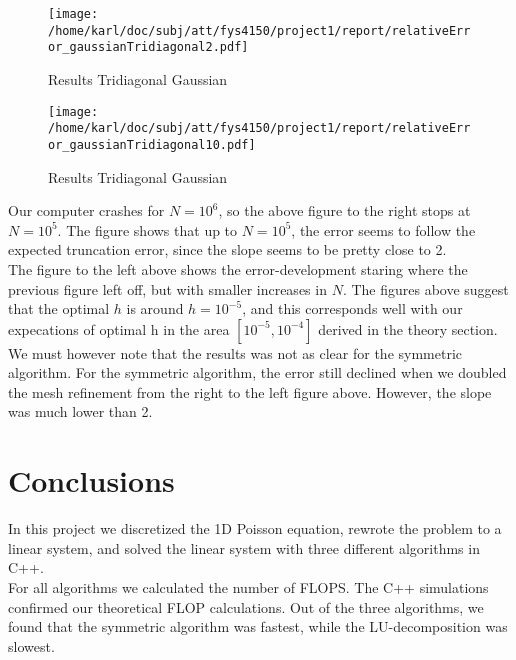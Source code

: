 \documentclass{article}
\begin{document}
\begin{minipage}{.49\textwidth} %
	\begin{figure}[H]
		\centering
		\texttt{[image: /home/karl/doc/subj/att/fys4150/project1/report/relativeError\_gaussianTridiagonal2.pdf]}
		\caption{Results Tridiagonal Gaussian}
		\label{1}
	\end{figure}
	\end{minipage}\hfill
	\begin{minipage}{.49\textwidth}
	\begin{figure}[H]
		\centering
		\texttt{[image: /home/karl/doc/subj/att/fys4150/project1/report/relativeError\_gaussianTridiagonal10.pdf]}
		\caption{Results Tridiagonal Gaussian}
		\label{1}
	\end{figure}
\end{minipage}\hfill


Our computer crashes for $N = 10^6$, so the above figure to the right stops at $N = 10^5$. The figure shows that up to $N = 10^5$, the error seems to follow the expected truncation error, since the slope seems to be pretty close to 2.\\

The figure to the left above shows the error-development staring where the previous figure left off, but with smaller increases in $N$. The figures above suggest that the optimal $h$ is around $h = 10^{-5}$, and this corresponds well with our expecations of optimal h in the area $[10^{-5}, 10^{-4}]$ derived in the theory section.\\
 
We must however note that the results was not as clear for the symmetric algorithm. For the symmetric algorithm, the error still declined when we doubled the mesh refinement from the right to the left figure above. However, the slope was much lower than 2.

\section{Conclusions}
In this project we discretized the 1D Poisson equation, rewrote the problem to a linear system, and solved the linear system with three different algorithms in C++.\\

For all algorithms we calculated the number of FLOPS. The C++ simulations confirmed our theoretical FLOP calculations. Out of the three algorithms, we found that the symmetric algorithm was fastest, while the LU-decomposition was slowest. \\
\end{document}
